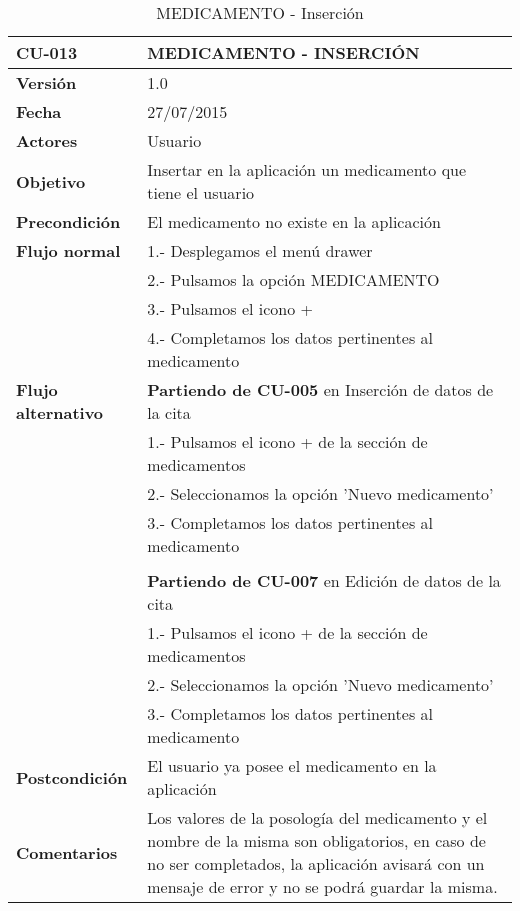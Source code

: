 \documentclass[../pfc.tex]{subfiles}
\begin{document}
		\begin{table}[H]
			\centering
			\begin{tabular}[t]{|p{3cm}|p{9.5cm}|}
				\hline \textbf{CU-013} & \textbf{MEDICAMENTO - INSERCIÓN} \\*
				\hline\hline \textbf{Versión} & 1.0 \\*
				\hline\hline \textbf{Fecha} & 27/07/2015 \\*
				\hline\textbf{Actores} 	& Usuario\\*
				\hline \textbf{Objetivo} & Insertar en la aplicación un medicamento que tiene el usuario\\* 			
				\hline \textbf{Precondición} & El medicamento no existe en la aplicación\\* 
				\hline \textbf{Flujo normal} & 1.- Desplegamos el menú drawer \\* 
				& 2.- Pulsamos la opción MEDICAMENTO\\*	
				& 3.- Pulsamos el icono + \\*	
				& 4.- Completamos los datos pertinentes al medicamento\\*	
				\hline \textbf{Flujo alternativo} & \textbf{Partiendo de CU-005} en Inserción de datos de la cita\\* 
				& 1.- Pulsamos el icono + de la sección de medicamentos\\*	
				& 2.- Seleccionamos la opción 'Nuevo medicamento'\\*
				& 3.- Completamos los datos pertinentes al medicamento\\*
				& \\*
				& \textbf{Partiendo de CU-007} en Edición de datos de la cita\\* 
				& 1.- Pulsamos el icono + de la sección de medicamentos\\*	
				& 2.- Seleccionamos la opción 'Nuevo medicamento'\\*
				& 3.- Completamos los datos pertinentes al medicamento\\*
				\hline \textbf{Postcondición} & El usuario ya posee el medicamento en la aplicación \\* 
				\hline \textbf{Comentarios}   & Los valores de la posología del medicamento y el nombre de la misma son obligatorios, en caso de no ser completados, la aplicación avisará con un mensaje de error y no se podrá guardar la misma.\\*
				\hline
			\end{tabular}
			\caption{MEDICAMENTO - Inserción}
			\label{tabla:caso013}
		\end{table}
		
\end{document}
